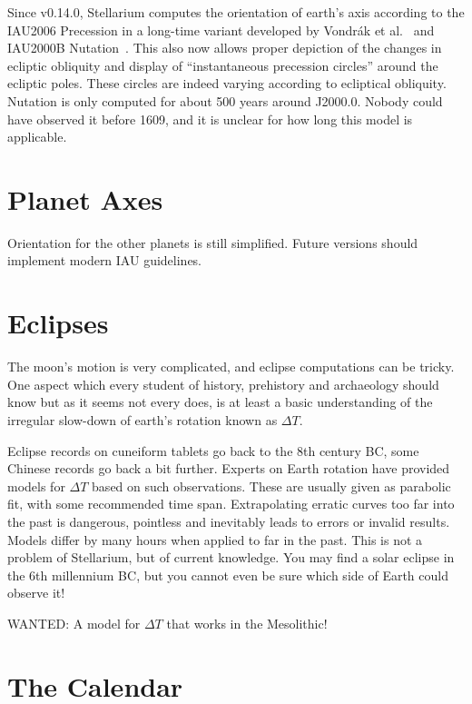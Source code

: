 Since v0.14.0, Stellarium computes the orientation of earth's axis
according to the IAU2006 Precession in a long-time variant developed
by Vondr\'ak et al.~\cite{2011AA:Vondrak} and IAU2000B Nutation~\cite{Nutation:IAU2000B}. 
This also now allows proper depiction of the changes in ecliptic obliquity
and display of ``instantaneous precession circles'' around the
ecliptic poles. These circles are indeed varying according to
ecliptical obliquity. Nutation is only computed for about 500 years
around J2000.0. Nobody could have observed it before 1609, and it is
unclear for how long this model is applicable.

\section{Planet Axes}
\label{sec:Accuracy:PlanetAxes}

Orientation for the other planets is still simplified. Future versions
should implement modern IAU guidelines.

\section{Eclipses}
\label{sec:Accuracy:Eclipses}

The moon's motion is very complicated, and eclipse computations can be tricky. 
One aspect which every student of history, prehistory and archaeology should 
know but as it seems not every does, is at least a basic understanding of the 
irregular slow-down of earth's rotation known as $\Delta T$. 

Eclipse records on cuneiform tablets go back to the 8th century BC, some Chinese 
records go back a bit further. Experts on Earth rotation have provided models 
for $\Delta T$ based on such observations. These are usually given as parabolic fit, 
with some recommended time span. Extrapolating erratic curves too far into the past is dangerous, 
pointless and inevitably leads to errors or invalid results. Models differ by many hours 
when applied to far in the past. This is not a problem of Stellarium, 
but of current knowledge. You may find a solar eclipse in the 6th millennium BC, 
but you cannot even be sure which side of Earth could observe it!

WANTED: A model for $\Delta T$ that works in the Mesolithic! 

\section{The Calendar}
\label{sec:Accuracy:Calendar}

